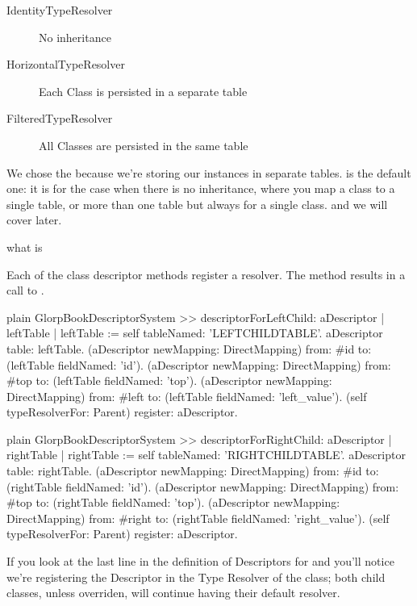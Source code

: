 \documentclass[10pt,twoside,english]{_support/latex/sbabook/sbabook}
\begin{document}
\begin{description}
\item[IdentityTypeResolver ] No inheritance
\item[HorizontalTypeResolver] Each Class is persisted in a separate table
\item[FilteredTypeResolver] All Classes are persisted in the same table
\end{description}

We chose the  because we're storing our instances
in separate tables.   is the default one: it is for the case when there is no inheritance,
where you map a class to a single table, or more than one table but always for a single class.
and we will cover  later.

\begin{todo}
what is 
\end{todo}

Each of the class descriptor methods register a resolver.
The method  results in a call to .

\begin{displaycode}{plain}
GlorpBookDescriptorSystem >> descriptorForLeftChild: aDescriptor
	| leftTable |
	leftTable := self tableNamed: 'LEFTCHILDTABLE'.
	aDescriptor table: leftTable.
	(aDescriptor newMapping: DirectMapping)
		from: #id to: (leftTable fieldNamed: 'id').
	(aDescriptor newMapping: DirectMapping)
		from: #top to: (leftTable fieldNamed: 'top').
	(aDescriptor newMapping: DirectMapping)
		from: #left to: (leftTable fieldNamed: 'left_value').
	(self typeResolverFor: Parent) register: aDescriptor.
\end{displaycode}

\begin{displaycode}{plain}
GlorpBookDescriptorSystem >> descriptorForRightChild: aDescriptor
	| rightTable |
	rightTable := self tableNamed: 'RIGHTCHILDTABLE'.
	aDescriptor table: rightTable.
	(aDescriptor newMapping: DirectMapping)
		from: #id to: (rightTable fieldNamed: 'id').
	(aDescriptor newMapping: DirectMapping)
		from: #top to: (rightTable fieldNamed: 'top').
	(aDescriptor newMapping: DirectMapping)
		from: #right to: (rightTable fieldNamed: 'right_value').
	(self typeResolverFor: Parent) register: aDescriptor.
\end{displaycode}

If you look at the last line in the definition of Descriptors for 
and  you'll notice we're registering the Descriptor in the
Type Resolver of the  class; both child classes, unless overriden,
will continue having their default resolver.
\end{document}
